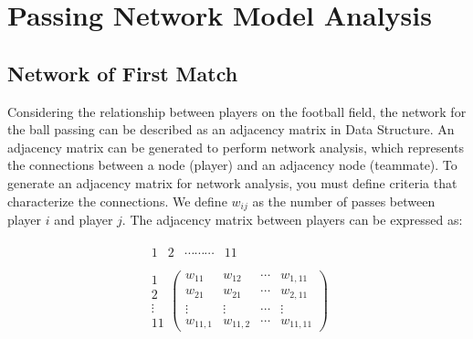 \documentclass{mcmthesis}
\begin{document}
\section{Passing Network Model Analysis}
\subsection{Network of First Match}
Considering the relationship between players on the football field, the network for
the ball passing can be described as an adjacency matrix in Data Structure. An adjacency
matrix can be generated to perform network analysis, which represents the
connections between a node (player) and an adjacency node (teammate). To generate
an adjacency matrix for network analysis, you must define criteria that characterize
the connections. We define $w_{ij}$ as the number of passes between player $i$ and player $j$.
The adjacency matrix between players can be expressed as:

\begin{equation}
        \begin{array}{l}
                \begin{array}{llll}
                         1 & 2 & \cdots \cdots \cdots & 11\\
                \end{array}                   \\
                \begin{array}{cccc}
                        1      \\
                        2      \\
                        \vdots \\
                        11
                \end{array}\left(\begin{array}{cccc}
                                                 w_{11}   & w_{12}   & \cdots & w_{1,11}  \\
                                                 w_{21}   & w_{21}   & \cdots & w_{2,11}  \\
                                                 \vdots   & \vdots   & \cdots & \vdots    \\
                                                 w_{11,1} & w_{11,2} & \cdots & w_{11,11}
                                         \end{array}\right) \\
        \end{array}
\end{equation}
\end{document}
